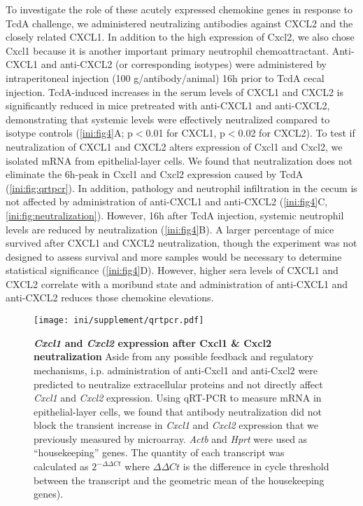 To investigate the role of these acutely expressed chemokine genes 
in response to TcdA challenge, we administered neutralizing antibodies 
against CXCL2 and the closely related CXCL1. In addition to the high 
expression of Cxcl2, we also chose Cxcl1 because it is another 
important primary neutrophil chemoattractant. Anti-CXCL1 and anti-CXCL2 
(or corresponding isotypes) were administered by intraperitoneal 
injection (100 \textmugreek{}g/antibody/animal) 16h prior to TcdA cecal 
injection. TcdA-induced increases in the serum levels of CXCL1 and 
CXCL2 is significantly reduced in mice pretreated with anti-CXCL1 
and anti-CXCL2, demonstrating that systemic levels were effectively 
neutralized compared to isotype controls (\autoref{ini:fig4}A; 
p$<$0.01 for CXCL1, p$<$0.02 for CXCL2). To test if neutralization 
of CXCL1 and CXCL2 alters expression of Cxcl1 and Cxcl2, we 
isolated mRNA from epithelial-layer cells. We found that neutralization 
does not eliminate the 6h-peak in Cxcl1 and Cxcl2 expression caused by 
TcdA (\autoref{ini:fig:qrtpcr}). In addition, pathology and neutrophil 
infiltration in the cecum is not affected by administration of 
anti-CXCL1 and anti-CXCL2 (\autoref{ini:fig4}C, \autoref{ini:fig:neutralization}). 
However, 16h after TcdA injection, systemic neutrophil levels are 
reduced by neutralization (\autoref{ini:fig4}B). A larger percentage 
of mice survived after CXCL1 and CXCL2 neutralization, though the 
experiment was not designed to assess survival and more samples would 
be necessary to determine statistical significance (\autoref{ini:fig4}D). 
However, higher sera levels of CXCL1 and CXCL2 correlate with a moribund 
state and administration of anti-CXCL1 and anti-CXCL2 reduces those 
chemokine elevations.



\begin{figure}
\centering
\texttt{[image: ini/supplement/qrtpcr.pdf]}
\caption[\emph{Cxcl1} and \emph{Cxcl2} expression after Cxcl1 \& Cxcl2 neutralization]
{ \textbf{\emph{Cxcl1} and \emph{Cxcl2} expression after Cxcl1 \& Cxcl2 neutralization}
Aside from any possible feedback and regulatory mechanisms, i\@.p\@. administration of anti-Cxcl1 and
anti-Cxcl2 were predicted to neutralize extracellular proteins and not directly affect 
\emph{Cxcl1} and \emph{Cxcl2} expression. Using qRT-PCR to measure mRNA
in epithelial-layer cells, we found that antibody neutralization did not block the transient
increase in \emph{Cxcl1} and \emph{Cxcl2} expression that we previously 
measured by microarray. \emph{Actb} and \emph{Hprt}
were used as ``housekeeping'' genes.
The quantity of each transcript was calculated as $2^{-\Delta \Delta Ct}$ where
$\Delta \Delta Ct$ is the difference in cycle threshold between the transcript and the 
geometric mean of the housekeeping genes).
 }
\label{ini:fig:qrtpcr}
\end{figure}

